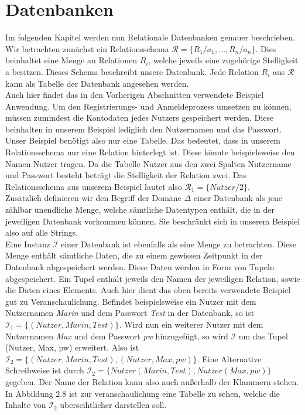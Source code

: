\section{Datenbanken}
Im folgenden Kapitel werden nun Relationale Datenbanken genauer beschrieben. Wir betrachten zunächst ein Relationsschema  $\mathcal{R} = \{R_1/a_1,…,R_n/a_n\}$. Dies beinhaltet eine Menge an Relationen $R_i$, welche jeweils eine zugehörige Stelligkeit a besitzen. Dieses Schema beschreibt unsere Datenbank. Jede Relation $R_i$ aus  $\mathcal{R}$ kann als Tabelle der Datenbank angesehen werden. \\
Auch hier findet das in den Vorherigen Abschnitten verwendete Beispiel Anwendung. Um den Registrierungs- und Anmeldeprozess umsetzen zu können, müssen zumindest die Kontodaten jedes Nutzers gespeichert werden. Diese beinhalten in unserem Beispiel lediglich den Nutzernamen und das Passwort. Unser Beispiel benötigt also nur eine Tabelle. Das bedeutet, dass in unserem Relationsschema nur eine Relation hinterlegt ist. Diese könnte beispielsweise den Namen Nutzer tragen. Da die Tabelle Nutzer aus den zwei Spalten Nutzername und Passwort besteht beträgt die Stelligkeit der Relation zwei. Das Relationsschema aus unserem Beispiel lautet also $\mathcal{R}_1=\{Nutzer/2\}$. \\
Zusätzlich definieren wir den Begriff der Domäne ${\Delta}$ einer Datenbank als jene zählbar unendliche Menge, welche sämtliche Datentypen enthält, die in der jeweiligen Datenbank vorkommen können. Sie beschränkt sich in unserem Beispiel also auf alle Strings. \\
Eine Instanz $\mathcal{I}$ einer Datenbank ist ebenfalls als eine Menge zu betrachten. Diese Menge enthält sämtliche Daten, die zu einem gewissen Zeitpunkt in der Datenbank abgespeichert werden. Diese Daten werden in Form von Tupeln abgespeichert. Ein Tupel enthält jeweils den Namen der jeweiligen Relation, sowie die Daten eines Elements. Auch hier dient das oben bereits verwendete Beispiel gut zu Veranschaulichung. Befindet beispielsweise ein Nutzer mit dem Nutzernamen \emph{Marin} und dem Passwort \emph{Test} in der Datenbank, so ist $\mathcal{I}_1 = \{(Nutzer, Marin, Test)\}$. Wird nun ein weiterer Nutzer mit dem Nutzernamen \emph{Max} und dem Passwort \emph{pw} hinzugefügt, so wird $\mathcal{I}$ um das Tupel (Nutzer, Max, pw) erweitert. Also ist $\mathcal{I}_2 =\{(Nutzer, Marin, Test), (Nutzer, Max, pw)\}$. Eine Alternative Schreibweise ist durch $\mathcal{I}_2 = \{Nutzer(Marin, Test), Nutzer(Max, pw)\}$ gegeben. Der Name der Relation kann also auch außerhalb der Klammern stehen.\\
In Abbildung 2.8 ist zur veranschaulichung eine Tabelle zu sehen, welche die Inhalte von $\mathcal{I}_2$ überscihtlicher darstellen soll.


